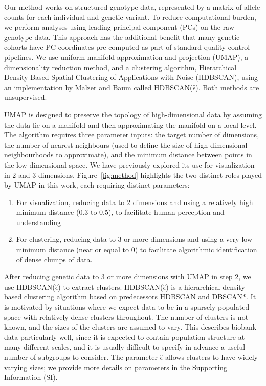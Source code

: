 \clearpage

Our method works on structured genotype data, represented by a matrix of allele counts for each individual and genetic variant. To reduce computational burden, we perform analyses using leading principal component (PCs) on the raw genotype data. This approach has the additional benefit that many genetic cohorts have PC coordinates pre-computed as part of standard quality control pipelines. We use uniform manifold approximation and projection (UMAP)\citep{mcinnes_umap_2020}, a dimensionality reduction method, and a clustering algorithm, Hierarchical Density-Based Spatial Clustering of Applications with Noise (HDBSCAN), using an implementation by Malzer and Baum called HDBSCAN($\hat{\epsilon}$)\citep{malzer_hybrid_2020}. Both methods are unsupervised.

UMAP is designed to preserve the topology of high-dimensional data by assuming the data lie on a manifold and then approximating the manifold on a local level\citep{mcinnes_umap_2020}. The algorithm requires three parameter inputs: the target number of dimensions, the number of nearest neighbours (used to define the size of high-dimensional neighbourhoods to approximate), and the minimum distance between points in the low-dimensional space. We have previously explored its use for visualization in $2$ and $3$ dimensions\citep{diaz-papkovich_umap_2019}. Figure~\ref{fig:method} highlights the two distinct roles played by UMAP in this work, each requiring distinct parameters:  

\begin{enumerate}
\item For visualization, reducing data to $2$ dimensions and using a relatively high minimum distance ($0.3$ to $0.5$), to facilitate human perception and understanding
\item For clustering, reducing data to $3$ or more dimensions and using a very low minimum distance (near or equal to $0$) to facilitate algorithmic identification of dense clumps of data.
\end{enumerate}

After reducing genetic data to $3$ or more dimensions with UMAP in step 2, we use HDBSCAN($\hat{\epsilon}$) to extract clusters. HDBSCAN($\hat{\epsilon}$) is a hierarchical density-based clustering algorithm based on predecessors HDBSCAN and DBSCAN*\citep{malzer_hybrid_2020}. It is motivated by situations where we expect data to be in a sparsely populated space with relatively dense clusters throughout. The number of clusters is not known, and the sizes of the clusters are assumed to vary. This describes biobank data particularly well, since it is expected to contain population structure at many different scales, and it is usually difficult to specify in advance a useful number of subgroups to consider. The parameter $\hat{\epsilon}$ allows clusters to have widely varying sizes; we provide more details on parameters in the Supporting Information (SI).

